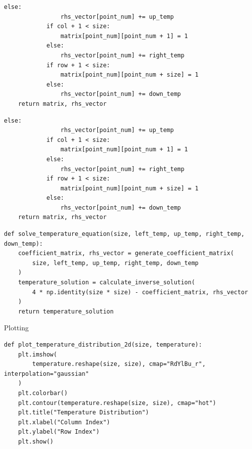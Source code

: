 \documentclass[aspectratio=169]{beamer}
\begin{document}
\begin{frame}[fragile]
  \begin{lstlisting}[style=Python]
            else:
                rhs_vector[point_num] += up_temp
            if col + 1 < size:
                matrix[point_num][point_num + 1] = 1
            else:
                rhs_vector[point_num] += right_temp
            if row + 1 < size:
                matrix[point_num][point_num + size] = 1
            else:
                rhs_vector[point_num] += down_temp
    return matrix, rhs_vector
  \end{lstlisting}
\end{frame}

\begin{frame}[fragile]
  \begin{lstlisting}[style=Python]
            else:
                rhs_vector[point_num] += up_temp
            if col + 1 < size:
                matrix[point_num][point_num + 1] = 1
            else:
                rhs_vector[point_num] += right_temp
            if row + 1 < size:
                matrix[point_num][point_num + size] = 1
            else:
                rhs_vector[point_num] += down_temp
    return matrix, rhs_vector
  \end{lstlisting}
\end{frame}

\begin{frame}[fragile]
\begin{lstlisting}[style=Python]
def solve_temperature_equation(size, left_temp, up_temp, right_temp, down_temp):
    coefficient_matrix, rhs_vector = generate_coefficient_matrix(
        size, left_temp, up_temp, right_temp, down_temp
    )
    temperature_solution = calculate_inverse_solution(
        4 * np.identity(size * size) - coefficient_matrix, rhs_vector
    )
    return temperature_solution
\end{lstlisting}
\end{frame}

\begin{frame}[fragile]{Plotting}
\begin{lstlisting}[style=Python]
def plot_temperature_distribution_2d(size, temperature):
    plt.imshow(
        temperature.reshape(size, size), cmap="RdYlBu_r", interpolation="gaussian"
    )
    plt.colorbar()
    plt.contour(temperature.reshape(size, size), cmap="hot")
    plt.title("Temperature Distribution")
    plt.xlabel("Column Index")
    plt.ylabel("Row Index")
    plt.show()
\end{lstlisting}
\end{frame}
\end{document}
